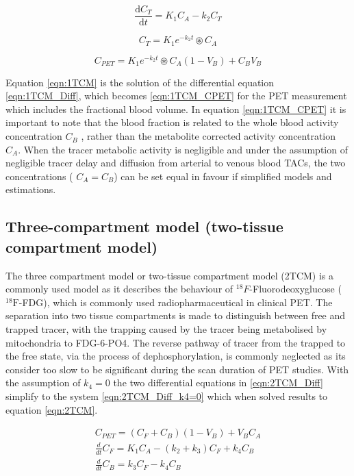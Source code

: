 \begin{equation}
  \frac{\mathrm d C_T}{\mathrm d t} = K_1 C_A - k_2 C_T
  \label{eqn:1TCM_Diff}
\end{equation}

\begin{equation}
   C_T = K_1 e^{-k_2 t} \circledast C_A 
  \label{eqn:1TCM}
\end{equation}

\begin{equation}
   C_{PET} =   K_1 e^{-k_2 t} \circledast C_A  (1-V_B) + C_B V_B
  \label{eqn:1TCM_CPET}
\end{equation}

Equation \ref{eqn:1TCM} is the solution of the differential equation \ref{eqn:1TCM_Diff}, which becomes \ref{eqn:1TCM_CPET} for the PET measurement which includes the fractional blood volume. In equation \ref{eqn:1TCM_CPET} it is important to note that the blood fraction is related to the whole blood activity concentration $C_B$ , rather than the metabolite corrected activity concentration $C_A$. When the tracer metabolic activity is negligible and under the assumption of negligible tracer delay and diffusion from arterial to venous blood TACs, the two concentrations ( $C_A = C_B$) can be set equal in favour if simplified models and estimations. 

\subsection{Three-compartment model (two-tissue compartment model)}
The three compartment model or two-tissue compartment model (2TCM) is a commonly used model as it describes the behaviour of ${}^{18}F$-Fluorodeoxyglucose (${}^{18}\mathrm{F}$-FDG), which is commonly used radiopharmaceutical in clinical PET. The separation into two tissue compartments is made to distinguish between free and trapped tracer, with the trapping caused by the tracer being metabolised by mitochondria to FDG-6-PO4. The reverse pathway of tracer from the trapped to the free state, via the process of dephosphorylation, is commonly neglected as its consider too slow to be significant during the scan duration of PET studies. With the assumption of $k_4=0$ the two differential equations in \ref{eqn:2TCM_Diff} simplify to the system \ref{eqn:2TCM_Diff_k4=0} which when solved results to equation \ref{eqn:2TCM}. 

\begin{subequations}
\begin{align}
C_{PET} = (C_F + C_B)(1-V_B) + V_B C_A \\
\frac{d}{dt}C_F = K_1 C_A - (k_2 + k_3)C_F + k_4 C_B \\ 
\frac{d}{dt}C_B = k_3 C_F - k_4 C_B  
\end{align}
\label{eqn:2TCM_Diff}
\end{subequations}

